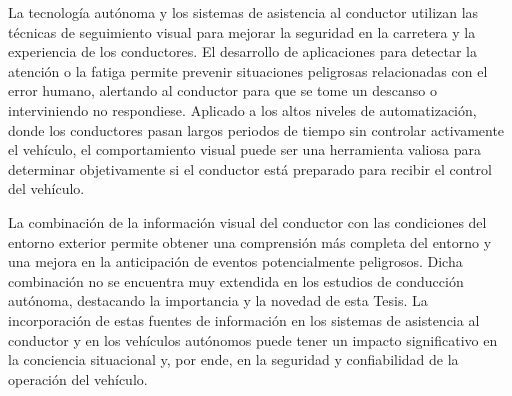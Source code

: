 La tecnología autónoma y los sistemas de asistencia al conductor utilizan las técnicas de seguimiento visual para mejorar la seguridad en la carretera y la experiencia de los conductores. El desarrollo de aplicaciones para detectar la atención o la fatiga permite prevenir situaciones peligrosas relacionadas con el error humano, alertando al conductor para que se tome un descanso o interviniendo no respondiese. Aplicado a los altos niveles de automatización, donde los conductores pasan largos periodos de tiempo sin controlar activamente el vehículo, el comportamiento visual puede ser una herramienta valiosa para determinar objetivamente si el conductor está preparado para recibir el control del vehículo. 

La combinación de la información visual del conductor con las condiciones del entorno exterior permite obtener una comprensión más completa del entorno y una mejora en la anticipación de eventos potencialmente peligrosos. Dicha combinación no se encuentra muy extendida en los estudios de conducción autónoma, destacando la importancia y la novedad de esta Tesis. La incorporación de estas fuentes de información en los sistemas de asistencia al conductor y en los vehículos autónomos puede tener un impacto significativo en la conciencia situacional y, por ende, en la seguridad y confiabilidad de la operación del vehículo. 
